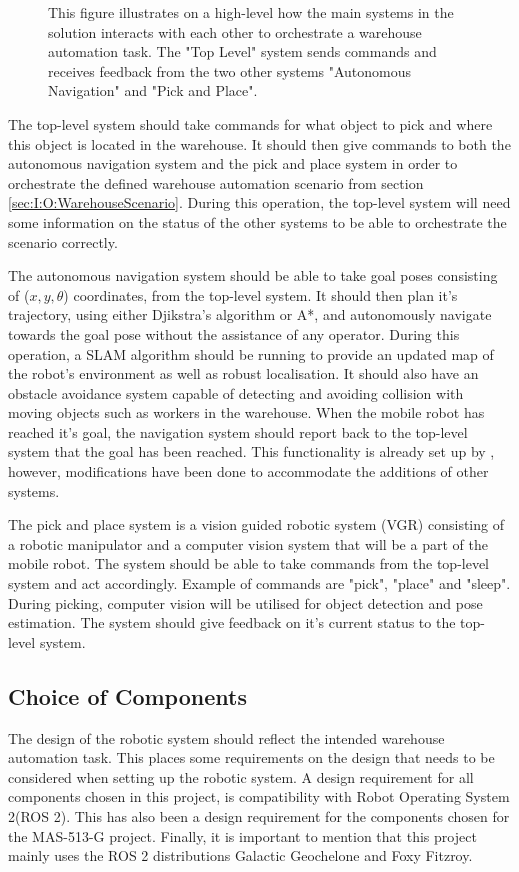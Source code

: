\begin{figure}[htp!]
    \fontsize{9}{14}\selectfont
    \centering
    
    \caption{This figure illustrates on a high-level how the main systems in the solution interacts with each other to orchestrate a warehouse automation task. The "Top Level" system sends commands and receives feedback from the two other systems "Autonomous Navigation" and "Pick and Place".}
    \label{fig:M:CD:topLevelMethod}
\end{figure}

The top-level system should take commands for what object to pick and where this object is located in the warehouse. It should then give commands to both the autonomous navigation system and the pick and place system in order to orchestrate the defined warehouse automation scenario from section \ref{sec:I:O:WarehouseScenario}. During this operation, the top-level system will need some information on the status of the other systems to be able to orchestrate the scenario correctly.

The autonomous navigation system should be able to take goal poses consisting of ($x,y,\theta$) coordinates, from the top-level system. It should then plan it's trajectory, using either Djikstra's algorithm or A*, and autonomously navigate towards the goal pose without the assistance of any operator. During this operation, a SLAM algorithm should be running to provide an updated map of the robot's environment as well as robust localisation. It should also have an obstacle avoidance system capable of detecting and avoiding collision with moving objects such as workers in the warehouse. When the mobile robot has reached it's goal, the navigation system should report back to the top-level system that the goal has been reached. This functionality is already set up by \cite{MAS513Rep}, however, modifications have been done to accommodate the additions of other systems.

The pick and place system is a vision guided robotic system (VGR) consisting of a robotic manipulator and a computer vision system that will be a part of the mobile robot. The system should be able to take commands from the top-level system and act accordingly. Example of commands are "pick", "place" and "sleep". During picking, computer vision will be utilised for object detection and pose estimation. The system should give feedback on it's current status to the top-level system.

\subsection{Choice of Components} \label{sec:M:CD:ChoiceOfComponents}
The design of the robotic system should reflect the intended warehouse automation task. This places some requirements on the design that needs to be considered when setting up the robotic system. A design requirement for all components chosen in this project, is compatibility with Robot Operating System 2(ROS 2). This has also been a design requirement for the components chosen for the MAS-513-G project. Finally, it is important to mention that this project mainly uses the ROS 2 distributions Galactic Geochelone and Foxy Fitzroy.

